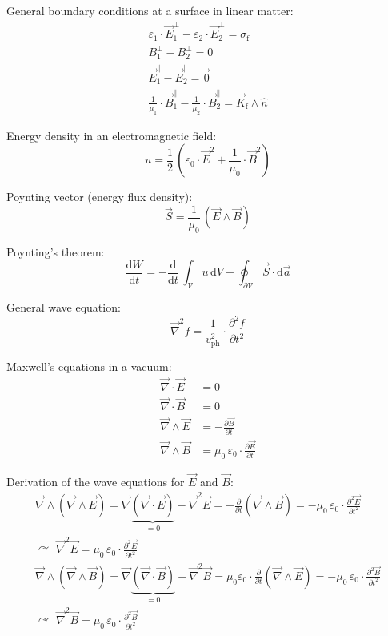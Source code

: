 \documentclass[fontsize=11pt,a4paper]{scrartcl}
\begin{document}
General boundary conditions at a surface in linear matter:
\begin{gather*}
	\varepsilon_1\cdot\vec E_1^\perp-\varepsilon_2\cdot\vec E_2^\perp=\sigma_\mathrm{f}\\
	B_1^\perp-B_2^\perp=0\\
	\vec E_1^\parallel-\vec E_2^\parallel=\vec 0\\
	\frac{1}{\mu_1}\cdot\vec B_1^\parallel-\frac{1}{\mu_2}\cdot\vec B_2^\parallel=\vec K_\mathrm{f}\wedge\hat n
\end{gather*}

Energy density in an electromagnetic field:
\[
	u=\frac{1}{2}\,\left(\varepsilon_0\cdot\vec E^2+\frac{1}{\mu_0}\cdot\vec B^2\right)
\]

Poynting vector (energy flux density):
\[
	\vec S=\frac{1}{\mu_0}\,(\vec E\wedge\vec B)
\]

Poynting's theorem:
\[
	\frac{\mathrm{d}W}{\mathrm{d}t}=-\frac{\mathrm{d}}{\mathrm{d}t}\,\int_\mathcal{V}u\,\mathrm{d}V-\oint_{\partial\mathcal{V}}\vec S\cdot\mathrm{d}\vec a
\]

General wave equation:
\[
	\vec\nabla^2 f=\frac{1}{v_\mathrm{ph}^2}\cdot\frac{\partial^2 f}{\partial t^2}
\]

Maxwell's equations in a vacuum:
\begin{align*}
	\vec\nabla\cdot\vec E&=0\\
	\vec\nabla\cdot\vec B&=0\\
	\vec\nabla\wedge\vec E&=-\frac{\partial\vec B}{\partial t}\\
	\vec\nabla\wedge\vec B&=\mu_0\,\varepsilon_0\cdot\frac{\partial\vec E}{\partial t}
\end{align*}

Derivation of the wave equations for $\vec E$ and $\vec B$:
\begin{gather*}
	\vec\nabla\wedge(\vec\nabla\wedge\vec E)=
		\vec\nabla\underbrace{(\vec\nabla\cdot\vec E)}_{=0}-\vec\nabla^2\vec E=-\frac{\partial}{\partial t}(\vec\nabla\wedge\vec B)=-\mu_0\,\varepsilon_0\cdot
		\frac{\partial^2\vec E}{\partial t^2}\\
	\curvearrowright\,\,\vec\nabla^2\vec E=\mu_0\,\varepsilon_0\cdot\frac{\partial^2\vec E}{\partial t^2}\\
	\vec\nabla\wedge(\vec\nabla\wedge\vec B)=
		\vec\nabla\underbrace{(\vec\nabla\cdot\vec B)}_{=0}-\vec\nabla^2\vec B=\mu_0\varepsilon_0\cdot\frac{\partial}{\partial t}(\vec\nabla\wedge\vec E)
		=-\mu_0\,\varepsilon_0\cdot\frac{\partial^2\vec B}{\partial t^2}\\
	\curvearrowright\,\,\vec\nabla^2\vec B=\mu_0\,\varepsilon_0\cdot\frac{\partial^2\vec B}{\partial t^2}
\end{gather*}
\end{document}
